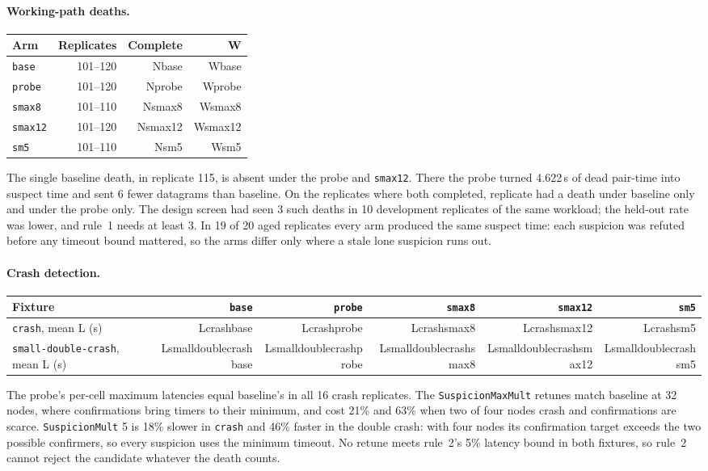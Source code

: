\documentclass[10pt]{article}
\newcommand{\R}[1]{\csname #1\endcsname}
\begin{document}
\paragraph{Working-path deaths.}
\begin{center}
\begin{tabular}{lrrr}
\toprule
Arm & Replicates & Complete & W \\
\midrule
\texttt{base} & 101--120 & \R{Nbase} & \R{Wbase} \\
\texttt{probe} & 101--120 & \R{Nprobe} & \R{Wprobe} \\
\texttt{smax8} & 101--110 & \R{Nsmax8} & \R{Wsmax8} \\
\texttt{smax12} & 101--120 & \R{Nsmax12} & \R{Wsmax12} \\
\texttt{sm5} & 101--110 & \R{Nsm5} & \R{Wsm5} \\
\bottomrule
\end{tabular}
\end{center}
The single baseline death, in replicate 115, is absent under the probe and
\texttt{smax12}. There the probe turned 4.622\,s of dead pair-time into
suspect time and sent 6 fewer datagrams than baseline. On the
\Wcommon{} replicates where both completed, \Wonlybase{} replicate had a
death under baseline only and \Wonlyprobe{} under the probe only. The
design screen had seen 3 such deaths in 10 development replicates of the
same workload; the held-out rate was lower, and rule~1 needs at least 3.
In 19 of 20 aged replicates every arm produced the same suspect time:
each suspicion was refuted before any timeout bound mattered, so the arms
differ only where a stale lone suspicion runs out.

\paragraph{Crash detection.}
\begin{center}
\begin{tabular}{lrrrrr}
\toprule
Fixture & \texttt{base} & \texttt{probe} & \texttt{smax8} & \texttt{smax12} & \texttt{sm5} \\
\midrule
\texttt{crash}, mean L (s) & \R{Lcrashbase} & \R{Lcrashprobe} & \R{Lcrashsmax8} & \R{Lcrashsmax12} & \R{Lcrashsm5} \\
\texttt{small-double-crash}, mean L (s) & \R{Lsmalldoublecrashbase} & \R{Lsmalldoublecrashprobe} & \R{Lsmalldoublecrashsmax8} & \R{Lsmalldoublecrashsmax12} & \R{Lsmalldoublecrashsm5} \\
\bottomrule
\end{tabular}
\end{center}
The probe's per-cell maximum latencies equal baseline's in all 16 crash
replicates. The \texttt{SuspicionMaxMult} retunes match baseline at 32
nodes, where confirmations bring timers to their minimum, and cost 21\%
and 63\% when two of four nodes crash and confirmations are scarce.
\texttt{SuspicionMult} 5 is 18\% slower in \texttt{crash} and 46\% faster in
the double crash: with four nodes its confirmation target exceeds the
two possible confirmers, so every suspicion uses the minimum timeout. No retune meets rule~2's 5\% latency bound in both
fixtures, so rule~2 cannot reject the candidate whatever the death counts.
\end{document}
